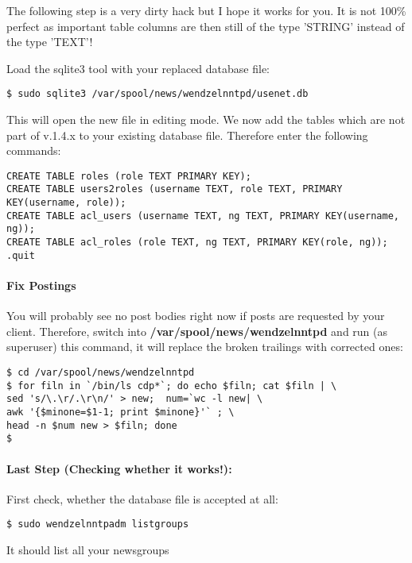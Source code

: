 The following step is a very dirty hack but I hope it works for you. It is not 100\% perfect as important table columns are then still of the type 'STRING' instead of the type 'TEXT'!

Load the sqlite3 tool with your replaced database file:

\begin{verbatim}
$ sudo sqlite3 /var/spool/news/wendzelnntpd/usenet.db
\end{verbatim}

This will open the new file in editing mode. We now add the tables which are not part of v.1.4.x to your existing database file. Therefore enter the following commands:

\begin{verbatim}
CREATE TABLE roles (role TEXT PRIMARY KEY);
CREATE TABLE users2roles (username TEXT, role TEXT, PRIMARY KEY(username, role));
CREATE TABLE acl_users (username TEXT, ng TEXT, PRIMARY KEY(username, ng));
CREATE TABLE acl_roles (role TEXT, ng TEXT, PRIMARY KEY(role, ng));
.quit
\end{verbatim}


\paragraph*{Fix Postings}

You will probably see no post bodies right now if posts are requested by your client. Therefore, switch into \textbf{/var/spool/news/wendzelnntpd} and run (as superuser) this command, it will replace the broken trailings with corrected ones:

\begin{verbatim}
$ cd /var/spool/news/wendzelnntpd
$ for filn in `/bin/ls cdp*`; do echo $filn; cat $filn | \
sed 's/\.\r/.\r\n/' > new;  num=`wc -l new| \
awk '{$minone=$1-1; print $minone}'` ; \
head -n $num new > $filn; done
$
\end{verbatim}

\paragraph*{Last Step (Checking whether it works!):}

First check, whether the database file is accepted at all:

\begin{verbatim}
$ sudo wendzelnntpadm listgroups
\end{verbatim}

It should list all your newsgroups

